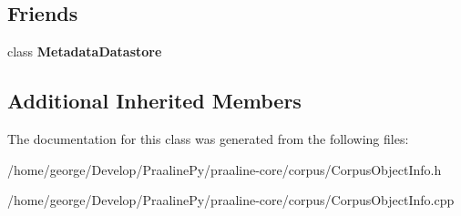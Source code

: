 \subsection*{Friends}
\begin{DoxyCompactItemize}
\item 
\mbox{\label{class_corpus_object_info_ad11ed9c2858f2dd5f875ff78f29d4875}} 
class {\bfseries Metadata\+Datastore}
\end{DoxyCompactItemize}
\subsection*{Additional Inherited Members}


The documentation for this class was generated from the following files\+:\begin{DoxyCompactItemize}
\item 
/home/george/\+Develop/\+Praaline\+Py/praaline-\/core/corpus/Corpus\+Object\+Info.\+h\item 
/home/george/\+Develop/\+Praaline\+Py/praaline-\/core/corpus/Corpus\+Object\+Info.\+cpp\end{DoxyCompactItemize}
